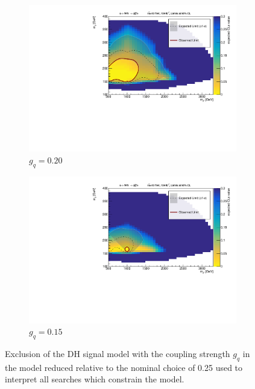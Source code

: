 \begin{figure}[h]
  \centering
  \begin{subfigure}{0.48\textwidth}
    \includegraphics[width=\textwidth]{Figures/8/unblinded_0_20_nosig.pdf}
    \caption{\(g_q=0.20\)}\label{fig:unblinded_0.20}
  \end{subfigure} \hspace{0.3em}
  \begin{subfigure}{0.48\textwidth}
    \includegraphics[width=\textwidth]{Figures/8/unblinded_0_15_nosig.pdf}
    \caption{\(g_q=0.15\)}\label{fig:unblinded_0.15}
  \end{subfigure} \vspace{1em}
  \caption[]{Exclusion of the DH signal model with the coupling strength \(g_q\) in the model reduced relative to the nominal choice of 0.25 used to interpret all searches which constrain the model.}
  \label{fig:limits_vary_gq}
\end{figure}

